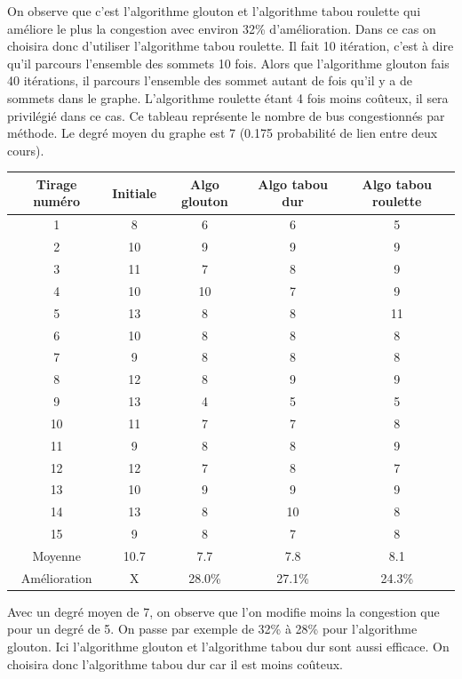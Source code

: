 \documentclass[a4paper,11pt]{article}
\begin{document}
	On observe que c'est l'algorithme glouton et l'algorithme tabou roulette qui améliore le plus la congestion avec environ 32\% d'amélioration. Dans ce cas on choisira donc d'utiliser l'algorithme tabou roulette. Il fait 10 itération, c'est à dire qu'il parcours l'ensemble des sommets 10 fois. Alors que l'algorithme glouton fais 40 itérations, il parcours l'ensemble des sommet autant de fois qu'il y a de sommets dans le graphe. L'algorithme roulette étant 4 fois moins coûteux, il sera privilégié dans ce cas.
	\newpage
	Ce tableau représente le nombre de bus congestionnés par méthode. Le degré moyen du graphe est 7 (0.175 probabilité de lien entre deux cours).\\ 
	\begin{tabular}{|c|c|c|c|c|}
  		\hline
  		Tirage numéro & Initiale & Algo glouton & Algo tabou dur & Algo tabou roulette\\
  		\hline
  		1 & 8 & 6 & 6 & 5\\
  		\hline
  		2 & 10 & 9 & 9 & 9\\
  		\hline
  		3 & 11 & 7 & 8 & 9\\
  		\hline
  		4 & 10 & 10 & 7 & 9\\
  		\hline
  		5 & 13 & 8 & 8 & 11\\
  		\hline
  		6 & 10 & 8 & 8 & 8\\
  		\hline
  		7 & 9 & 8 & 8 & 8\\
  		\hline
  		8 & 12 & 8 & 9 & 9\\
  		\hline
  		9 & 13 & 4 & 5 & 5\\
  		\hline
  		10 & 11 & 7 & 7 & 8\\
  		\hline
  		11 & 9 & 8 & 8 & 9\\
  		\hline
  		12 & 12 & 7 & 8 & 7\\
  		\hline
  		13 & 10 & 9 & 9 & 9\\
  		\hline
  		14 & 13 & 8 & 10 & 8\\
  		\hline
  		15 & 9 & 8 & 7 & 8\\
  		\hline
  		Moyenne & 10.7 & 7.7 & 7.8 & 8.1\\
  		\hline
  		Amélioration & X & 28.0\% & 27.1\% & 24.3\%\\
  		\hline
	\end{tabular}
	Avec un degré moyen de 7, on observe que l'on modifie moins la congestion que pour un degré de 5. On passe par exemple de 32\% à 28\% pour l'algorithme glouton.
	Ici l'algorithme glouton et l'algorithme tabou dur sont aussi efficace. On choisira donc l'algorithme tabou dur car il est moins coûteux. 
\end{document}
